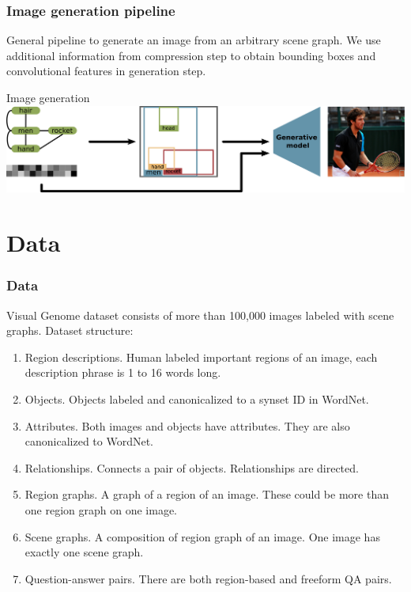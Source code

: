 \documentclass[10pt]{beamer}
\begin{document}
\begin{frame}
    \frametitle{Image generation pipeline}
    General pipeline to generate an image from an arbitrary scene graph. We use additional information from compression step to obtain bounding boxes and convolutional features in generation step.
    \begin{block}{Image generation}
        \includegraphics[width=\textwidth]{figure/image-generation-from-sg.png}
    \end{block}
\end{frame}

\section{Data}
\begin{frame}
    \frametitle{Data}
    Visual Genome dataset consists of more than 100,000 images labeled with scene graphs.
    Dataset structure:
    \begin{enumerate}
        \item Region descriptions. Human labeled important regions of an image, each description phrase is 1 to 16 words long.
        \item Objects. Objects labeled and canonicalized to a synset ID in WordNet.
        \item Attributes. Both images and objects have attributes. They are also canonicalized to WordNet.
        \item Relationships. Connects a pair of objects. Relationships are directed.
        \item Region graphs. A graph of a region of an image. These could be more than one region graph on one image.
        \item Scene graphs. A composition of region graph of an image. One image has exactly one scene graph.
        \item Question-answer pairs. There are both region-based and freeform QA pairs.
    \end{enumerate}
\end{frame}
\end{document}
